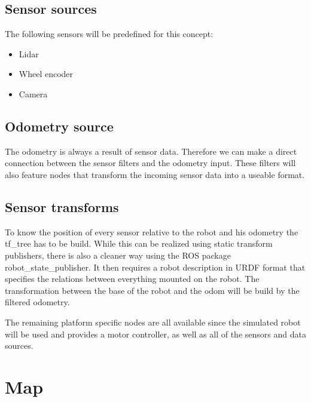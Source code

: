 \subsection{Sensor sources}

The following sensors will be predefined for this concept:

\begin{itemize}
	\item Lidar
	\item Wheel encoder
	\item Camera
\end{itemize}


\subsection{Odometry source}
The odometry is always a result of sensor data. Therefore we can make a direct connection between the sensor filters and the odometry input. These filters will also feature nodes that transform the incoming sensor data into a useable format.

\subsection{Sensor transforms}
To know the position of every sensor relative to the robot and his odometry the tf\_tree has to be build. While this can be realized using static transform publishers, there is also a cleaner way using the ROS package robot\_state\_publisher. It then requires a robot description in URDF format that specifies the relations between everything mounted on the robot.
The transformation between the base of the robot and the odom will be build by the filtered odometry.

The remaining platform specific nodes are all available since the simulated robot will be used and provides a motor controller, as well as all of the sensors and data sources.

\section{Map}


